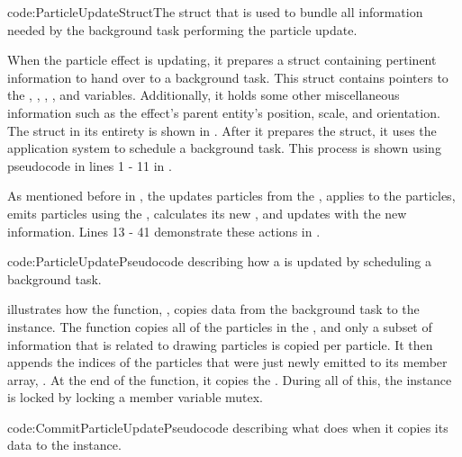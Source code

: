 {code:ParticleUpdateStruct}{The struct that is used to bundle all information needed by the background task performing the particle update.}

When the particle effect is updating, it prepares a struct containing pertinent information to hand over to a background task. This struct contains pointers to the , , , , and  variables. Additionally, it holds some other miscellaneous information such as the effect's parent entity's position, scale, and orientation. The struct in its entirety is shown in . After it prepares the struct, it uses the  application system to schedule a background task. This process is shown using pseudocode in lines 1 - 11 in .

As mentioned before in , the  updates particles from the , applies  to the particles, emits particles using the , calculates its new , and updates  with the new information. Lines 13 - 41 demonstrate these actions in .

{code:ParticleUpdate}{Pseudocode describing how a  is updated by scheduling a background task.}

 illustrates how the function, , copies data from the background task to the  instance. The function copies all of the particles in the , and only a subset of information that is related to drawing particles is copied per particle. It then appends the indices of the particles that were just newly emitted to its member array, . At the end of the function, it copies the . During all of this, the  instance is locked by locking a member variable mutex. 

{code:CommitParticleUpdate}{Pseudocode describing what  does when it copies its data to the  instance.}


